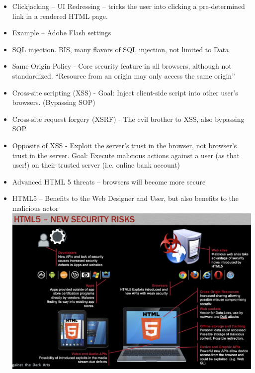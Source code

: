 \documentclass[12pt]{article}
\begin{document}
\begin{itemize}
\item Clickjacking – UI Redressing – tricks the user into clicking a pre-determined link in a rendered HTML page.
\item Example – Adobe Flash settings
\item SQL injection. BIS, many flavors of SQL injection, not limited to Data
\item Same Origin Policy - Core security feature in all browsers, although not standardized. “Resource from an origin may only access the same origin”
\item Cross-site scripting (XSS) - Goal: Inject client-side script into other user’s browsers. (Bypassing SOP)
\item Cross-site request forgery (XSRF) - The evil brother to XSS, also bypassing SOP
\item Opposite of XSS - Exploit the server’s trust in the browser, not browser’s trust in the server. Goal: Execute malicious actions against a user (as that user!) on their trusted server (i.e. online bank account)
\item Advanced HTML 5 threats – browsers will become more secure
\item HTML5 – Benefits to the Web Designer and User, but also benefits to the malicious actor
\includegraphics{1.png}
\end{itemize}
\end{document}
